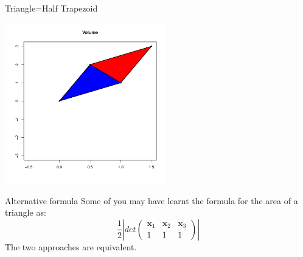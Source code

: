 \documentclass[10pt]{beamer}
\begin{document}
                                                                                              \begin{frame}{Triangle=Half Trapezoid}
                                                                                                \begin{center}
                                                                                                  \includegraphics[height=7cm]{RCode/geom4.pdf}
                                                                                                \end{center}
                                                                                              \end{frame}
                                                                                              \begin{frame}{Alternative formula}
                                                                                                Some of you may have learnt the formula for the area of a triangle as:
                                                                                                \begin{equation}
                                                                                                  \frac{1}{2}\left|det\left(
                                                                                                      \begin{array}{ccc}
                                                                                                        {\bm x_1}& {\bm x_2}& {\bm x_3}\\
                                                                                                        1 & 1 & 1
                                                                                                      \end{array}
                                                                                                    \right)\right|
                                                                                                \end{equation}
                                                                                                The two approaches are equivalent.
                                                                                              \end{frame}
\end{document}
